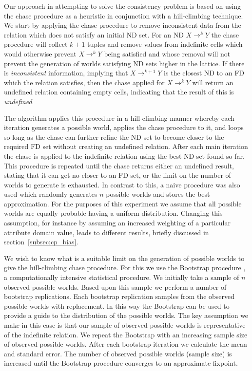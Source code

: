Our approach in attempting to solve the consistency problem is based on using
the chase procedure \cite{bv84,Mann92} as a heuristic in conjunction 
with a hill-climbing
technique. We start by applying the chase procedure to remove
inconsistent data from the relation which does not satisfy an
initial ND set. For an ND $X \to^k Y$ the chase procedure will
collect $k + 1$ tuples and remove values from indefinite cells
which would otherwise prevent $X \to^k Y$ being satisfied and whose
removal will not prevent the generation of worlds satisfying ND sets
higher in the lattice.
If there is {\em inconsistent} information, implying that 
$X \to^{k+1} Y$ is
the closest ND to an FD which the relation satisfies, then the
chase applied for $X \to^k Y$ will return an undefined relation
containing empty cells, indicating that the result of this is {\em undefined}.

\smallskip

The algorithm applies this procedure in a hill-climbing manner
whereby each iteration generates a possible world, applies the
chase procedure to it, and loops so long as the chase can
further refine the ND set to become closer to the required FD set without
creating an undefined relation.
After each main iteration the chase is applied to the indefinite
relation using the best ND set found so far. This procedure is repeated until
the chase returns either an undefined result, stating that it can get no
closer to an FD set, or the limit on the number of worlds to
generate is exhausted.  In contrast to this, a naive procedure
was also used which randomly generates $n$ possible worlds and stores the best approximation.
For the purposes of this experiment we assume that all possible worlds
are equally probable having a uniform distribution. Changing this assumption,
for instance by assuming an increased weighting of a particular attribute 
domain value, leads to different results, briefly discussed in
section~\ref{subsec:cp_bias}. 

\smallskip

We wish to know what is a suitable limit on the generation of possible 
worlds to give the hill-climbing
chase procedure. For this we use the Bootstrap procedure \cite{et86,et93}, a computationally intensive statistical procedure. We
initially take a sample of $n$ observed possible worlds. Based upon this sample
we perform a number of bootstrap replications. Each bootstrap
replication samples from the observed possible worlds with replacement.
In this way the Bootstrap can be used to provide a guide to the 
distribution of the possible worlds. The key assumption we make in this
case is that our sample of observed possible worlds is representative
of the indefinite relation. We repeat the Bootstrap with an increasing sample size of observed possible
worlds. After each bootstrap iteration we calculate the mean and 
standard error.  The number of observed possible worlds (sample size)
 is increased
until the Bootstrap procedure converges to an approximate fixpoint.

